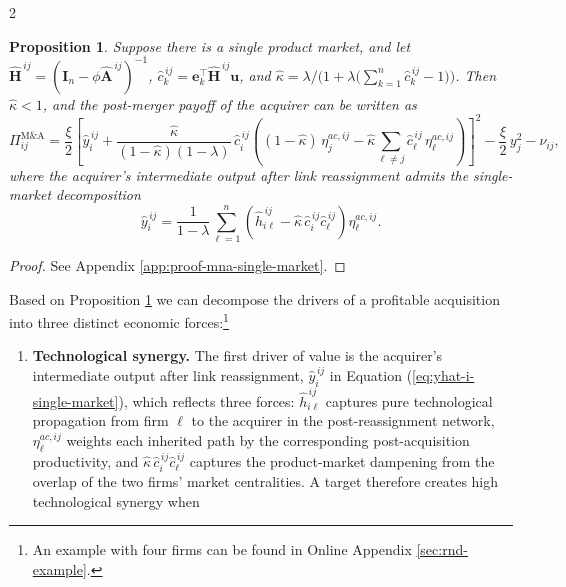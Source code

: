 \documentclass[12pt]{article}
\newtheorem{proposition}[claim]{Proposition}
\begin{document}
\begin{spacing}{2}
\begin{proposition}%
\label{prop:mna-single-market}
Suppose there is a single product market, and let
$\widehat{\mathbf{H}}^{\,ij}=(\mathbf{I}_n-\phi\widehat{\mathbf{A}}^{\,ij})^{-1}$,
$\widehat c_k^{\,ij}=\mathbf{e}_k^{\top}\widehat{\mathbf{H}}^{\,ij}\mathbf{u}$,
and
$\widehat\kappa=\lambda/\big(1+\lambda\big(\sum_{k=1}^n \widehat
c_k^{\,ij}-1\big)\big)$. Then $\widehat\kappa<1$, and
the post-merger payoff of the acquirer 
can be written as
\begin{equation}
\Pi_{ij}^{\mathrm{M\&A}}
=
\frac{\xi}{2}
\left[
\widehat y_i^{\,ij}
+
\frac{\widehat\kappa}{(1-\widehat\kappa)(1-\lambda)}
\,\widehat c_i^{\,ij}
\left(
(1-\widehat\kappa)\,\eta_j^{ac,ij}
-
\widehat\kappa
\sum_{\ell \neq j}
\widehat c_\ell^{\,ij}\,\eta_\ell^{ac,ij}
\right)
\right]^2
-
\frac{\xi}{2}\,y_j^2
-
\nu_{ij},
\label{eq:mna-profit-simplified-inserted}
\end{equation}
where the acquirer's intermediate output after link reassignment admits the
single-market decomposition
\begin{equation}
\widehat y_i^{\,ij}
=
\frac{1}{1-\lambda}
\sum_{\ell=1}^n
\left(
\widehat h_{i\ell}^{\,ij}
-
\widehat\kappa\,
\widehat c_i^{\,ij}
\widehat c_\ell^{\,ij}
\right)
\eta_\ell^{ac,ij}.
\label{eq:yhat-i-single-market}
\end{equation}
\end{proposition}
\begin{proof}
See Appendix \ref{app:proof-mna-single-market}.
\end{proof}
Based on Proposition \ref{prop:mna-single-market} we can decompose the drivers of a profitable acquisition into three distinct economic forces:\footnote{An example with four firms can be found in Online Appendix \ref{sec:rnd-example}.}
\begin{enumerate}
\item \textbf{Technological synergy.}
The first driver of value is the acquirer's intermediate output after link
reassignment, $\widehat y_i^{\,ij}$ in Equation
(\ref{eq:yhat-i-single-market}), which reflects three forces:
$\widehat h_{i\ell}^{\,ij}$ captures pure technological propagation from firm
$\ell$ to the acquirer in the post-reassignment network, $\eta_\ell^{ac,ij}$
weights each inherited path by the corresponding post-acquisition
productivity, and $\widehat\kappa\,\widehat c_i^{\,ij}\widehat c_\ell^{\,ij}$
captures the product-market dampening from the overlap of the two firms'
market centralities. A target therefore creates high technological synergy when

\end{enumerate}
\end{spacing}
\end{document}
